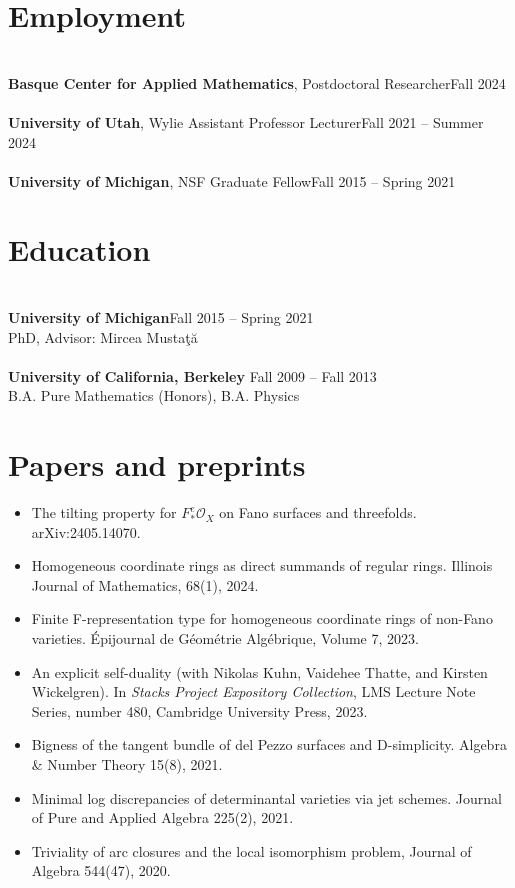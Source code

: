 \documentclass{res}
\begin{document}
\renewcommand\sectionfont{\large \sc}
\begin{resume}

\section{Employment} 
\ \\
{\bf Basque Center for Applied Mathematics}, Postdoctoral Researcher\hfill Fall 2024
\\\\
{\bf University of Utah}, Wylie Assistant Professor Lecturer\hfill Fall 2021 -- Summer 2024
\\\\
{\bf University of Michigan}, NSF Graduate Fellow\hfill Fall 2015 -- Spring 2021
\section{Education} 
\ \\
{\bf University of Michigan}\hfill Fall 2015 -- Spring 2021
\\ PhD, Advisor: Mircea Musta\c{t}\u{a}
\\
\\
{\bf University of California, Berkeley} \hfill Fall 2009 -- Fall 2013\\B.A. Pure Mathematics (Honors),  B.A. Physics 



\section{Papers and preprints} 
%
\begin{itemize}
\item The tilting property for $F_*^e\mathcal O_X$ on Fano surfaces and threefolds.  arXiv:2405.14070.
\item Homogeneous coordinate rings as direct summands of regular rings.  Illinois Journal of Mathematics, 68(1), 2024.
\item Finite F-representation type for homogeneous coordinate rings of non-Fano varieties.  \'Epijournal de G\'eom\'etrie Alg\'ebrique, Volume 7, 2023.
\item An explicit self-duality (with Nikolas Kuhn, Vaidehee Thatte, and Kirsten Wickelgren). In \emph{Stacks Project Expository Collection}, LMS Lecture Note Series, number 480, Cambridge University Press, 2023.
\item Bigness of the tangent bundle of del Pezzo surfaces and D-simplicity. Algebra \& Number Theory 15(8), 2021.
\item
Minimal log discrepancies of determinantal varieties via jet schemes. Journal of Pure and Applied Algebra 225(2), 2021.
\item
Triviality of arc closures and the local isomorphism problem, Journal of Algebra 544(47), 2020.
\end{itemize}


\end{resume}
\end{document}
